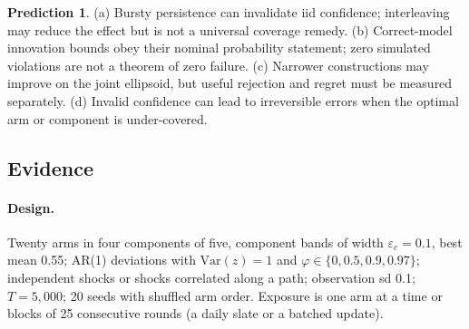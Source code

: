 \documentclass[11pt]{article}
\theoremstyle{definition}
\newtheorem{prediction}{Prediction}
\theoremstyle{remark}
\newcommand{\Var}{\mathrm{Var}}
\begin{document}
\begin{prediction}\label{pred:q3}
(a) Bursty persistence can invalidate iid confidence; interleaving may reduce the effect but is not a universal coverage remedy. (b) Correct-model innovation bounds obey their nominal probability statement; zero simulated violations are not a theorem of zero failure. (c) Narrower constructions may improve on the joint ellipsoid, but useful rejection and regret must be measured separately. (d) Invalid confidence can lead to irreversible errors when the optimal arm or component is under-covered.
\end{prediction}

\subsection{Evidence}

\paragraph{Design.} Twenty arms in four components of five, component bands of width $\varepsilon_c=0.1$, best mean 0.55; AR(1) deviations with $\Var(z)=1$ and $\varphi\in\{0,0.5,0.9,0.97\}$; independent shocks or shocks correlated along a path; observation sd 0.1; $T=5{,}000$; 20 seeds with shuffled arm order. Exposure is one arm at a time or blocks of 25 consecutive rounds (a daily slate or a batched update).

\begin{table}[t]\centering\small
{}
\caption{B2's prediction against observed violations (blocks of 25; both shock structures). With one-at-a-time exposure, iid certificates were never violated at any $\varphi$. Run-level rates exceed per-check rates because each run checks 24 statistics every round.}\label{tab:b2}
\end{table}
\end{document}
